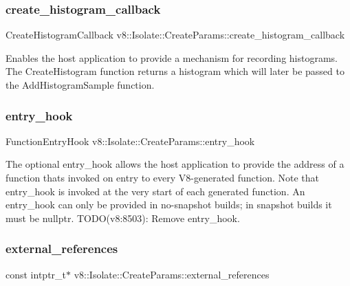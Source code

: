 \subsubsection{\texorpdfstring{create\+\_\+histogram\+\_\+callback}{create\_histogram\_callback}}
{\footnotesize\ttfamily Create\+Histogram\+Callback v8\+::\+Isolate\+::\+Create\+Params\+::create\+\_\+histogram\+\_\+callback}

Enables the host application to provide a mechanism for recording histograms. The Create\+Histogram function returns a histogram which will later be passed to the Add\+Histogram\+Sample function. \mbox{\label{structv8_1_1Isolate_1_1CreateParams_aa7aa18bbe2d86713e5b074a93b38dc60}} 
\subsubsection{\texorpdfstring{entry\+\_\+hook}{entry\_hook}}
{\footnotesize\ttfamily Function\+Entry\+Hook v8\+::\+Isolate\+::\+Create\+Params\+::entry\+\_\+hook}

The optional entry\+\_\+hook allows the host application to provide the address of a function that\textquotesingle{}s invoked on entry to every V8-\/generated function. Note that entry\+\_\+hook is invoked at the very start of each generated function. An entry\+\_\+hook can only be provided in no-\/snapshot builds; in snapshot builds it must be nullptr. T\+O\+D\+O(v8\+:8503)\+: Remove entry\+\_\+hook. \mbox{\label{structv8_1_1Isolate_1_1CreateParams_a89b8c9dc74efbdcd93ab5786eae6fe19}} 
\subsubsection{\texorpdfstring{external\+\_\+references}{external\_references}}
{\footnotesize\ttfamily const intptr\+\_\+t$\ast$ v8\+::\+Isolate\+::\+Create\+Params\+::external\+\_\+references}


